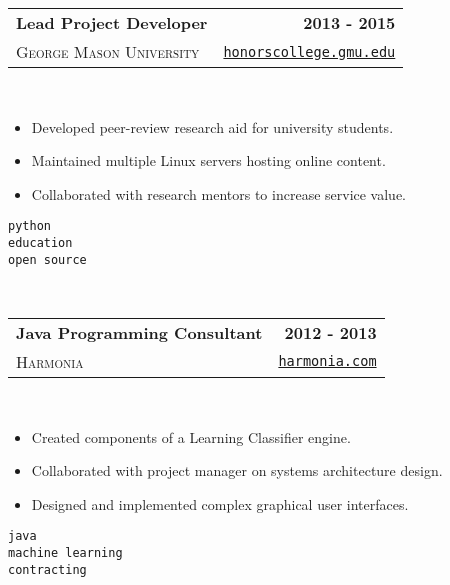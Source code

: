 \documentclass[10pt,letterpaper]{article}
\newenvironment{details}
{\begin{itemize}}
{\end{itemize}}
\begin{document}
  \noindent\begin{tabularx}{\textwidth}{@{}X r@{}}
    \textbf{Lead Project Developer} & \textbf{2013 - 2015} \\
    \textsc{George Mason University} & \texttt{\href{http://honorscollege.gmu.edu/collegeresearch}{honorscollege.gmu.edu}}
  \end{tabularx}
  \hfill\\
  \noindent\begin{minipage}[t]{\dimexpr.7\textwidth-.7\columnsep}
    \raggedright
    \begin{details}
    \item Developed peer-review research aid for university students.
    \item Maintained multiple Linux servers hosting online content.
    \item Collaborated with research mentors to increase service value.
    \end{details}
  \end{minipage}%
  \begin{minipage}[t]{\dimexpr.32\textwidth-.32\columnsep}
    \raggedleft
    \texttt{python} \\
    \texttt{education} \\
    \texttt{open source}
  \end{minipage}

  \hfill\\

  \noindent\begin{tabularx}{\textwidth}{@{}X r@{}}
    \textbf{Java Programming Consultant} & \textbf{2012 - 2013} \\
    \textsc{Harmonia} & \texttt{\href{https://harmonia.com}{harmonia.com}}
  \end{tabularx}
  \hfill\\
  \noindent\begin{minipage}[t]{\dimexpr.7\textwidth-.7\columnsep}
    \raggedright
    \begin{details}
    \item Created components of a Learning Classifier engine.
    \item Collaborated with project manager on systems architecture design.
    \item Designed and implemented complex graphical user interfaces.
    \end{details}
  \end{minipage}%
  \begin{minipage}[t]{\dimexpr.32\textwidth-.32\columnsep}
    \raggedleft
    \texttt{java} \\
    \texttt{machine learning} \\
    \texttt{contracting}
  \end{minipage}
\end{document}
